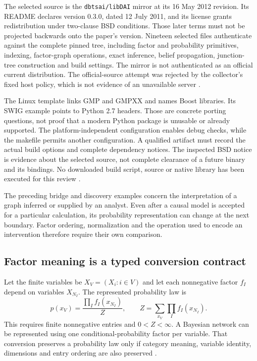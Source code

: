 The selected source is the \texttt{dbtsai/libDAI} mirror at its 16 May 2012
revision. Its README declares version 0.3.0, dated 12 July 2011, and its
license grants redistribution under two-clause BSD conditions. Those later
terms must not be projected backwards onto the paper's version. Nineteen
selected files authenticate against the complete pinned tree, including
factor and probability primitives, indexing, factor-graph operations, exact
inference, belief propagation, junction-tree construction and build settings.
The mirror is not authenticated as an official current distribution. The
official-source attempt was rejected by the collector's fixed host policy,
which is not evidence of an unavailable server
\cite{exec24_libdai_source,exec24_libdai_choice}.

The Linux template links GMP and GMPXX and names Boost libraries. Its SWIG
example points to Python 2.7 headers. Those are concrete porting questions,
not proof that a modern Python package is unusable or already supported.
The platform-independent configuration enables debug checks, while the
makefile permits another configuration. A qualified artifact must record
the actual build options and complete dependency notices. The inspected BSD
notice is evidence about the selected source, not complete clearance of a
future binary and its bindings. No downloaded build script, source or native
library has been executed for this review \cite{exec24_libdai_source}.

The preceding bridge and discovery examples concern the interpretation of a
graph inferred or supplied by an analyst. Even after a causal model is
accepted for a particular calculation, its probability representation can
change at the next boundary. Factor ordering, normalization and the operation
used to encode an intervention therefore require their own comparison.

\subsection{Factor meaning is a typed conversion contract}
Let the finite variables be $X_V=(X_i:i\in V)$ and let each nonnegative factor
$f_I$ depend on variables $X_{N_I}$. The represented probability law is
\[
 p(x_V)=\frac{\prod_I f_I(x_{N_I})}{Z},\qquad
 Z=\sum_{x_V}\prod_I f_I(x_{N_I}).
\]
This requires finite nonnegative entries and $0<Z<\infty$. A Bayesian network
can be represented using one conditional-probability factor per variable.
That conversion preserves a probability law only if category meaning,
variable identity, dimensions and entry ordering are also preserved
\cite{exec24_libdai_paper,exec24_libdai_source}.

